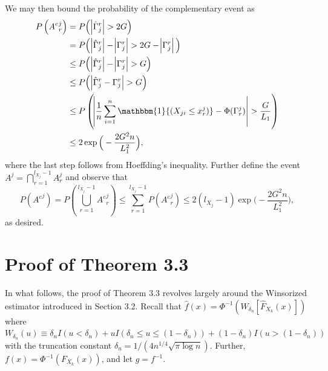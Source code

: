 We may then bound the probability of the complementary event as
\begin{equation*}
\begin{split}
    P\left({A^c}_{r}^{j}\right) &= P\Big(\abs{\hat{\Gamma}_j^r} > 2G\Big) \\
                     &= P\Big(\abs{\hat{\Gamma}_j^r} - \abs{\Gamma_j^r} > 2G - \abs{\Gamma_j^r}\Big) \\
                     &\leq P\Big(\abs{\hat{\Gamma}_j^r} - \abs{\Gamma_j^r} > G\Big) \\
                     &\leq P\Big(\abs{\hat{\Gamma}_j^r - \Gamma_j^r} > G\Big) \\
                     &\leq P\left(\abs{\frac{1}{n} \sum_{i=1}^n \mathbbm{1}{(X_{ji} \leq x_r^j)} - \Phi(\Gamma_r^j)} > \frac{G}{L_1}\right) \\ 
                     &\leq 2\exp{\Big(- \frac{2G^2n}{L_1^2}\Big)},
\end{split} 
\end{equation*}
where the last step follows from Hoeffding's inequality. Further define the event $A^j = \bigcap_{r=1}^{l_{X_j}-1} A_r^j$ and observe that
\begin{equation*}
    P\left({A^c}^j\right) = P\left(\bigcup_{r=1}^{l_{X_j}-1} {A^c}_r^j\right) \leq \sum_{r=1}^{l_{X_j}-1} P({A^c}_r^j) \leq 2(l_{X_j}-1)\exp{\Big(- \frac{2G^2n}{L_1^2}\Big)},
\end{equation*}
as desired. 


\section{Proof of Theorem 3.3
}\label{proof_concentration2}


In what follows, the proof of Theorem 3.3
revolves largely around the Winsorized estimator introduced in Section 3.2. %
Recall that $\hat{f}(x) = \Phi^{-1}(W_{\delta_n}[\hat{F}_{X_k}(x)])$ where $W_{\delta_n}(u) \equiv \delta_n I(u < \delta_n) + u I(\delta_n \leq u \leq (1-\delta_n)) + (1-\delta_n) I(u > (1-\delta_n))$ with the truncation constant $\delta_n = 1/(4n^{1/4}\sqrt{\pi\log n})$. Further, $f(x) = \Phi^{-1}(F_{X_k}(x))$, and let $g = f^{-1}$.
    

